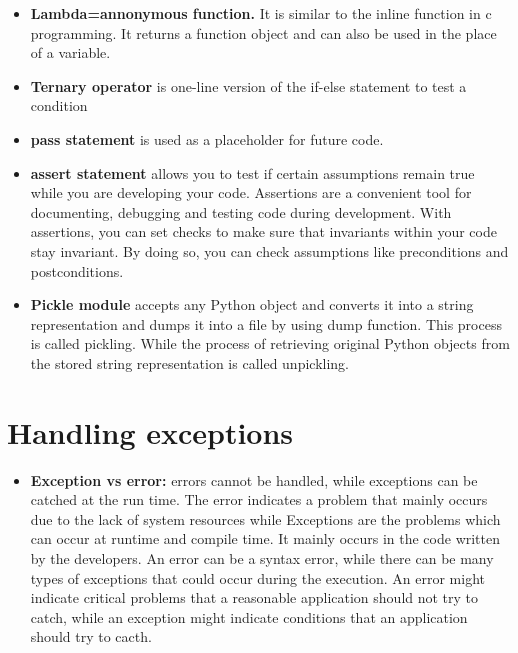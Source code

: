 \documentclass[
  letterpaper,
  DIV=11,
  numbers=noendperiod]{scrreprt}
\providecommand{\tightlist}{%
  \setlength{\itemsep}{0pt}\setlength{\parskip}{0pt}}\usepackage{longtable,booktabs,array}
\begin{document}
\begin{itemize}
\tightlist
\item
  \textbf{Lambda=annonymous function.} It is similar to the inline
  function in c programming. It returns a function object and can also
  be used in the place of a variable.
\item
  \textbf{Ternary operator} is one-line version of the if-else statement
  to test a condition
\item
  \textbf{pass statement} is used as a placeholder for future code.
\item
  \textbf{assert statement} allows you to test if certain assumptions
  remain true while you are developing your code. Assertions are a
  convenient tool for documenting, debugging and testing code during
  development. With assertions, you can set checks to make sure that
  invariants within your code stay invariant. By doing so, you can check
  assumptions like preconditions and postconditions.
\item
  \textbf{Pickle module} accepts any Python object and converts it into
  a string representation and dumps it into a file by using dump
  function. This process is called pickling. While the process of
  retrieving original Python objects from the stored string
  representation is called unpickling.
\end{itemize}

\hypertarget{handling-exceptions}{%
\section{Handling exceptions}\label{handling-exceptions}}

\begin{itemize}
\tightlist
\item
  \textbf{Exception vs error:} errors cannot be handled, while
  exceptions can be catched at the run time. The error indicates a
  problem that mainly occurs due to the lack of system resources while
  Exceptions are the problems which can occur at runtime and compile
  time. It mainly occurs in the code written by the developers. An error
  can be a syntax error, while there can be many types of exceptions
  that could occur during the execution. An error might indicate
  critical problems that a reasonable application should not try to
  catch, while an exception might indicate conditions that an
  application should try to cacth.
\end{itemize}
\end{document}
